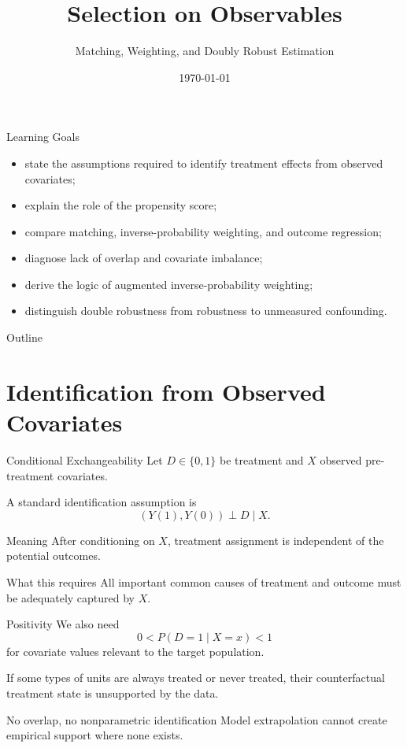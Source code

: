 \documentclass[aspectratio=169,11pt]{beamer}
\title[Selection on Observables]{Selection on Observables}
\subtitle{Matching, Weighting, and Doubly Robust Estimation}
\date{\today}
\begin{document}
\begin{frame}
\titlepage
\end{frame}

\begin{frame}{Learning Goals}
\begin{itemize}
\item state the assumptions required to identify treatment effects from observed covariates;
\item explain the role of the propensity score;
\item compare matching, inverse-probability weighting, and outcome regression;
\item diagnose lack of overlap and covariate imbalance;
\item derive the logic of augmented inverse-probability weighting;
\item distinguish double robustness from robustness to unmeasured confounding.
\end{itemize}
\end{frame}

\begin{frame}{Outline}
\tableofcontents
\end{frame}

\section{Identification from Observed Covariates}

\begin{frame}{Conditional Exchangeability}
Let \(D\in\{0,1\}\) be treatment and \(X\) observed pre-treatment covariates.

A standard identification assumption is
\[
(Y(1),Y(0)) \perp D \mid X.
\]

\begin{block}{Meaning}
After conditioning on \(X\), treatment assignment is independent of the potential outcomes.
\end{block}

\begin{alertblock}{What this requires}
All important common causes of treatment and outcome must be adequately captured by \(X\).
\end{alertblock}
\end{frame}

\begin{frame}{Positivity}
We also need
\[
0<P(D=1\mid X=x)<1
\]
for covariate values relevant to the target population.

If some types of units are always treated or never treated, their counterfactual treatment state is unsupported by the data.

\begin{alertblock}{No overlap, no nonparametric identification}
Model extrapolation cannot create empirical support where none exists.
\end{alertblock}
\end{frame}
\end{document}
